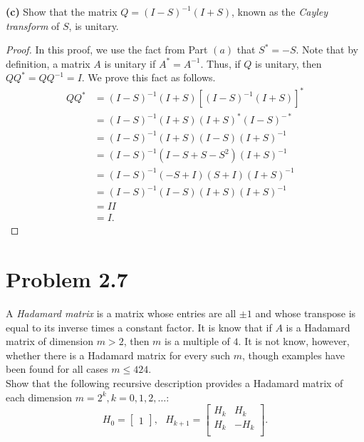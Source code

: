 \documentclass{article}
\begin{document}
\textbf{(c)} Show that the matrix $Q = (I-S)^{-1}(I+S)$, known as the \textit{Cayley transform} of $S$, is unitary. 
\begin{proof}
    In this proof, we use the fact from Part $(a)$ that $S^* = -S$. Note that by definition, a matrix $A$ is unitary if $A^* = A^{-1}$. Thus, if $Q$ is unitary, then $QQ^* = QQ^{-1} = I$. We prove this fact as follows.
    \begin{align*}
        QQ^* &= (I-S)^{-1}(I+S)[(I-S)^{-1}(I+S)]^*\\
        &= (I-S)^{-1}(I+S)(I+S)^*(I-S)^{-*}\\
        &= (I-S)^{-1}(I+S)(I-S)(I+S)^{-1}\\
        &= (I-S)^{-1}(I-S + S - S^2)(I+S)^{-1}\\
        &= (I-S)^{-1}(-S + I)(S + I)(I+S)^{-1}\\
        &= (I-S)^{-1}(I-S)(I+S)(I+S)^{-1}\\
        &= II\\
        &= I.
    \end{align*}
\end{proof}

\section*{Problem 2.7}
A \textit{Hadamard matrix} is a matrix whose entries are all $\pm 1$ and whose transpose is equal to its inverse times a constant factor. It is know that if $A$ is a Hadamard matrix of dimension $m > 2$, then $m$ is a multiple of $4$. It is not know, however, whether there is a Hadamard matrix for every such $m$, though examples have been found for all cases $m \leq 424$.\\

Show that the following recursive description provides a Hadamard matrix of each dimension $m = 2^k, k = 0, 1, 2, \dots$:
\[ H_0 = \begin{bmatrix}
    1
\end{bmatrix}, ~~~ H_{k+1} = \begin{bmatrix}
    H_k & H_k\\
    H_k & -H_k\\
\end{bmatrix}. \]
\end{document}
